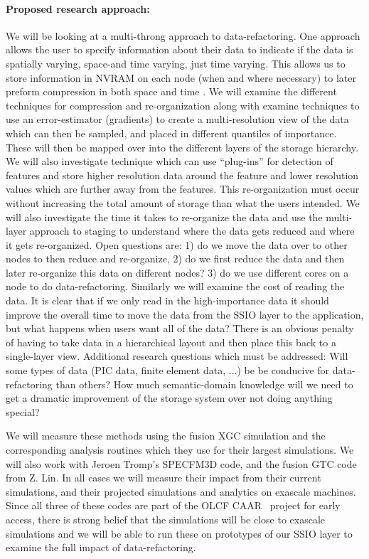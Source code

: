 \paragraph{Proposed research approach:} We will be looking at a multi-throng
approach to data-refactoring. One approach allows the user to specify
information about their data to indicate if the data is spatially varying,
space-and time varying, just time varying. This allows us to store information
in NVRAM on each node (when and where necessary) to later preform compression
in both space and time . We will examine the different techniques for
compression and re-organization along with examine techniques to use an
error-estimator (gradients) to create a multi-resolution view of the data which
can then be sampled, and placed in different quantiles of importance. These
will then be mapped over into the different layers of the storage hierarchy.
We will also investigate technique which can use ``plug-ins'' for detection of
features and store higher resolution data around the feature and lower
resolution values which are further away from the features. This
re-organization must occur without increasing the total amount of storage than
what the users intended. We will also investigate the time it takes to
re-organize the data and use the multi-layer approach to staging to understand
where the data gets reduced and where it gets re-organized. Open questions are:
1) do we move the data over to other nodes to then reduce and re-organize, 2)
do we first reduce the data and then later re-organize this data on different
nodes?  3) do we use different cores on a node to do data-refactoring.
Similarly we will examine the cost of reading the data. It is clear that if we
only read in the high-importance data it should improve the overall time to
move the data from the SSIO layer to the application, but what happens when
users want all of the data? There is an obvious penalty of having to take data
in a hierarchical layout and then place this back to a single-layer view.
Additional research questions which must be addressed: Will some types of data
(PIC data, finite element data, ...) be be conducive  for data-refactoring than
others? How much semantic-domain knowledge will we need to get a dramatic
improvement of the storage system over not doing anything special? 

We will measure these methods using the fusion XGC simulation and the
corresponding analysis routines which they use for their largest simulations.
We will also work with Jeroen Tromp's SPECFM3D code, and the fusion GTC code
from Z. Lin. In all cases we will measure their impact from their current
simulations, and their projected simulations and analytics on exascale
machines. Since all three of these codes are part of the OLCF CAAR~\cite{CAAR}
project for early access, there is strong belief that the simulations will be
close to exascale simulations and we will be able to run these on prototypes of
our SSIO layer to examine the full impact of data-refactoring.

